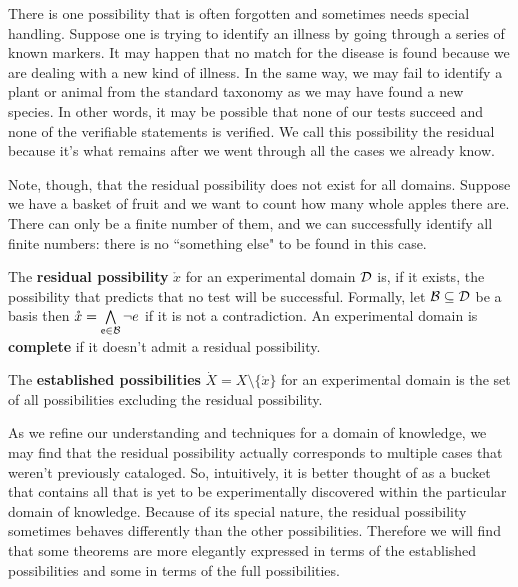 \documentclass[11pt,letterpaper,fleqn]{memoir} %
\begin{document}
There is one possibility that is often forgotten and sometimes needs special handling. Suppose one is trying to identify an illness by going through a series of known markers. It may happen that no match for the disease is found because we are dealing with a new kind of illness. In the same way, we may fail to identify a plant or animal from the standard taxonomy as we may have found a new species. In other words, it may be possible that none of our tests succeed and none of the verifiable statements is verified. We call this possibility the residual because it's what remains after we went through all the cases we already know.

Note, though, that the residual possibility does not exist for all domains. Suppose we have a basket of fruit and we want to count how many whole apples there are. There can only be a finite number of them, and we can successfully identify all finite numbers: there is no ``something else" to be found in this case.

\begin{mathSection}
	\begin{defn}
		The \textbf{residual possibility} $\mathring{x}$ for an experimental domain $\edomain$ is, if it exists, the possibility that predicts that no test will be successful. Formally, let $\basis \subseteq \edomain$ be a basis then  $\mathring{x} = \bigAND\limits_{\stmt[e] \in \basis} \NOT e$ if it is not a contradiction. An experimental domain is \textbf{complete} if it doesn't admit a residual possibility.
	\end{defn}

	\begin{defn}
	The \textbf{established possibilities} $\dot{X}=X\setminus\{\mathring{x}\}$ for an experimental domain is the set of all possibilities excluding the residual possibility.
\end{defn}
\end{mathSection}

As we refine our understanding and techniques for a domain of knowledge, we may find that the residual possibility actually corresponds to multiple cases that weren't previously cataloged. So, intuitively, it is better thought of as a bucket that contains all that is yet to be experimentally discovered within the particular domain of knowledge. Because of its special nature, the residual possibility sometimes behaves differently than the other possibilities. Therefore we will find that some theorems are more elegantly expressed in terms of the established possibilities and some in terms of the full possibilities.
\end{document}
